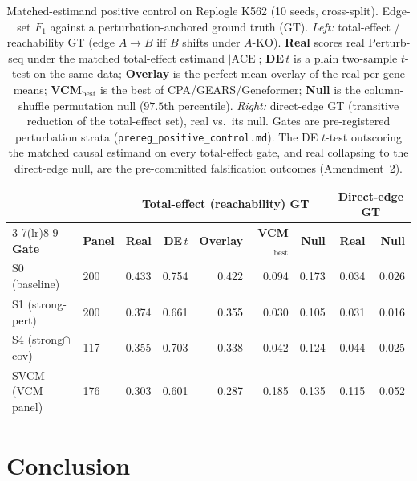 \documentclass{article}
\theoremstyle{plain}
\theoremstyle{definition}
\theoremstyle{remark}
\begin{document}
\begin{table}[t]
\vskip 0.1in
\caption{Matched-estimand positive control on Replogle K562 (10 seeds, cross-split). Edge-set $F_1$ against a perturbation-anchored ground truth (GT). \emph{Left:} total-effect / reachability GT (edge $A\to B$ iff $B$ shifts under $A$-KO). \textbf{Real} scores real Perturb-seq under the matched total-effect estimand $|\mathrm{ACE}|$; \textbf{DE\,$t$} is a plain two-sample $t$-test on the same data; \textbf{Overlay} is the perfect-mean overlay of the real per-gene means; \textbf{VCM$_{\text{best}}$} is the best of CPA/GEARS/Geneformer; \textbf{Null} is the column-shuffle permutation null ($97.5$th percentile). \emph{Right:} direct-edge GT (transitive reduction of the total-effect set), real vs.\ its null. Gates are pre-registered perturbation strata (\texttt{prereg\_positive\_control.md}). The DE $t$-test outscoring the matched causal estimand on every total-effect gate, and real collapsing to the direct-edge null, are the pre-committed falsification outcomes (Amendment~2).}
\label{tab:posctrl}
\centering
\small
\setlength{\tabcolsep}{5.5pt}
\begin{tabular}{llrrrrrrr}
\toprule
 & & \multicolumn{5}{c}{\textbf{Total-effect (reachability) GT}} & \multicolumn{2}{c}{\textbf{Direct-edge GT}} \\
\cmidrule(lr){3-7}\cmidrule(lr){8-9}
\textbf{Gate} & \textbf{Panel} & \textbf{Real} & \textbf{DE\,$t$} & \textbf{Overlay} & \textbf{VCM$_{\text{best}}$} & \textbf{Null} & \textbf{Real} & \textbf{Null} \\
\midrule
S0 (baseline)          & 200 & 0.433 & 0.754 & 0.422 & 0.094 & 0.173 & 0.034 & 0.026 \\
S1 (strong-pert)       & 200 & 0.374 & 0.661 & 0.355 & 0.030 & 0.105 & 0.031 & 0.016 \\
S4 (strong$\cap$cov)   & 117 & 0.355 & 0.703 & 0.338 & 0.042 & 0.124 & 0.044 & 0.025 \\
SVCM (VCM panel)       & 176 & 0.303 & 0.601 & 0.287 & 0.185 & 0.135 & 0.115 & 0.052 \\
\bottomrule
\end{tabular}
\vskip -0.05in
\end{table}

\section{Conclusion}
\label{sec:conclusion}
\end{document}
